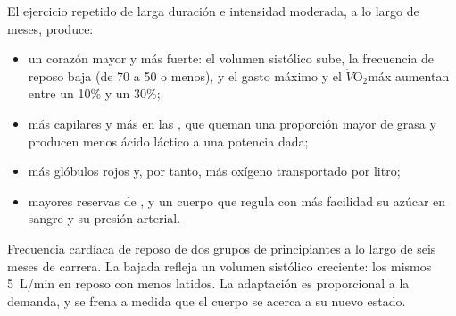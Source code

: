 \begin{proposition}\label{prop:g10:sport-and-health:endurance}
El ejercicio repetido de larga duración e intensidad moderada, a lo
largo de meses, produce:
\begin{itemize}
  \item un corazón mayor y más fuerte: el volumen sistólico sube, la
        frecuencia de reposo baja (de 70 a 50 o menos), y el gasto
        máximo y el $\dot V\!\mathrm{O_2}$máx aumentan entre un 10\% y
        un 30\%;
  \item más capilares y más  en las , que
        queman una proporción mayor de grasa y producen menos ácido
        láctico a una potencia dada;
  \item más glóbulos rojos y, por tanto, más oxígeno transportado por
        litro;
  \item mayores reservas de , y un cuerpo que regula con más
        facilidad su azúcar en sangre y su presión arterial.
\end{itemize}
\end{proposition}
\admitted

\begin{omfigure}

{\small Frecuencia cardíaca de reposo de dos grupos de principiantes a
lo largo de seis meses de carrera. La bajada refleja un volumen
sistólico creciente: los mismos \qty{5}{L/min} en reposo con menos
latidos. La adaptación es proporcional a la demanda, y se frena a
medida que el cuerpo se acerca a su nuevo estado.}
\end{omfigure}

